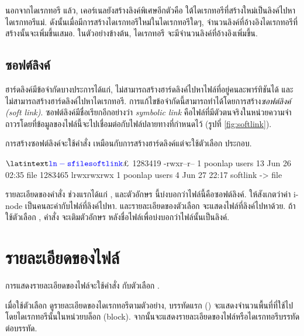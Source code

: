\begin{thwbr}
นอกจากไดเรกทอรี  แล้ว, เคอร์เนลยังสร้างลิงค์พิเศษอีกตัวคือ  ใต้ไดเรกทอรีที่สร้างใหม่เป็นลิงค์ไปหาไดเรกทอรีแม่. ดังนั้นเมื่อมีการสร้างไดเรกทอรีใหม่ในไดเรกทอรีใดๆ, จำนวนลิงค์ที่อ้างอิงไดเรกทอรีที่สร้างนั้นจะเพิ่มขึ้นเสมอ. ในตัวอย่างข้างต้น, ไดเรกทอรี  จะมีจำนวนลิงค์ที่อ้างอิงเพิ่มขึ้น.





\subsection{ซอฟต์ลิงค์}\label{sec:softlink}
ฮาร์ดลิงค์มีข้อจำกัดบางประการได้แก่, ไม่สามารถสร้างฮาร์ดลิงค์ไปหาไฟล์ที่อยู่คนละพาร์ทิชันได้ และไม่สามารถสร้างฮาร์ดลิงค์ไปหาไดเรกทอรี. การแก้ไขข้อจำกัดนี้สามารถทำได้โดยการสร้าง\emph{ซอฟต์ลิงค์ (soft link)}. ซอฟต์ลิงค์มีชื่อเรียกอีกอย่างว่า \emph{symbolic link} คือไฟล์ที่มีตัวตนจริงในหน่วยความจำถาวรโดยที่ข้อมูลของไฟล์นี้จะไปเชื่อมต่อกับไฟล์ปลายทางที่กำหนดไว้ (รูปที่ \ref{fig:softlink}).

\begin{figure}[!htb]
\end{figure}

การสร้างซอฟต์ลิงค์จะใช้คำสั่ง  เหมือนกับการสร้างฮาร์ดลิงค์แต่จะใช้ตัวเลือก  ประกอบ.


\begin{MyExample}
\begin{MyEx}
$ \cin{ln -s file softlink}
$ 
1283419 -rwxr--r--    1 poonlap  users          13 Jun 26 02:35 file
1283465 lrwxrwxrwx    1 poonlap  users           4 Jun 27 22:17 softlink -> file
\end{MyEx}
\end{MyExample}%
รายละเอียดของคำสั่ง  ช่วงแรกได้แก่ , และตัวอักษร  นี้บ่งบอกว่าไฟล์นี้คือซอฟต์ลิงค์. ให้สังเกตว่าค่า i-node เป็นคนละค่ากับไฟล์ที่ลิงค์ไปหา. และรายละเอียดของตัวเลือก  จะแสดงไฟล์ที่ลิงค์ไปหาด้วย. ถ้าใช้ตัวเลือก , คำสั่ง  จะเติมตัวอักษร  หลังชื่อไฟล์เพื่อบ่งบอกว่าไฟล์นั้นเป็นลิงค์.

\section{รายละเอียดของไฟล์}\label{ls-l}
การแสดงรายละเอียดของไฟล์จะใช้คำสั่ง  กับตัวเลือก .
\begin{MyExample}\label{ex:ls-l}
\end{MyExample}%
เมื่อใช้ตัวเลือก  ดูรายละเอียดของไดเรกทอรีตามตัวอย่าง, บรรทัดแรก () จะแสดงจำนวนพื้นที่ที่ใช้ไปโดยไดเรกทอรีนั้นในหน่วยบล็อก (block). จากนั้นจะแสดงรายละเอียดของไฟล์หรือไดเรกทอรีบรรทัดต่อบรรทัด.


\end{thwbr}
